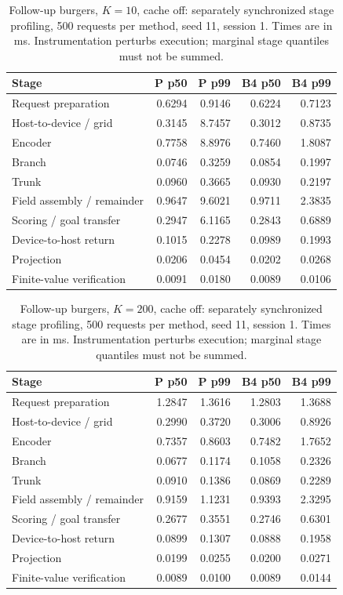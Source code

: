 \begin{table}[ht]
\centering\small
\caption{Follow-up burgers, $K=10$, cache off: separately synchronized stage profiling, 500 requests per method, seed 11, session 1. Times are in ms. Instrumentation perturbs execution; marginal stage quantiles must not be summed.}\label{tab:e2_profile_burgers_10_off}
\begin{tabular}{@{}lrrrr@{}}\toprule
Stage & P p50 & P p99 & B4 p50 & B4 p99\\\midrule
Request preparation & 0.6294 & 0.9146 & 0.6224 & 0.7123\\
Host-to-device / grid & 0.3145 & 8.7457 & 0.3012 & 0.8735\\
Encoder & 0.7758 & 8.8976 & 0.7460 & 1.8087\\
Branch & 0.0746 & 0.3259 & 0.0854 & 0.1997\\
Trunk & 0.0960 & 0.3665 & 0.0930 & 0.2197\\
Field assembly / remainder & 0.9647 & 9.6021 & 0.9711 & 2.3835\\
Scoring / goal transfer & 0.2947 & 6.1165 & 0.2843 & 0.6889\\
Device-to-host return & 0.1015 & 0.2278 & 0.0989 & 0.1993\\
Projection & 0.0206 & 0.0454 & 0.0202 & 0.0268\\
Finite-value verification & 0.0091 & 0.0180 & 0.0089 & 0.0106\\
\bottomrule\end{tabular}
\end{table}

\begin{table}[ht]
\centering\small
\caption{Follow-up burgers, $K=200$, cache off: separately synchronized stage profiling, 500 requests per method, seed 11, session 1. Times are in ms. Instrumentation perturbs execution; marginal stage quantiles must not be summed.}\label{tab:e2_profile_burgers_200_off}
\begin{tabular}{@{}lrrrr@{}}\toprule
Stage & P p50 & P p99 & B4 p50 & B4 p99\\\midrule
Request preparation & 1.2847 & 1.3616 & 1.2803 & 1.3688\\
Host-to-device / grid & 0.2990 & 0.3720 & 0.3006 & 0.8926\\
Encoder & 0.7357 & 0.8603 & 0.7482 & 1.7652\\
Branch & 0.0677 & 0.1174 & 0.1058 & 0.2326\\
Trunk & 0.0910 & 0.1386 & 0.0869 & 0.2289\\
Field assembly / remainder & 0.9159 & 1.1231 & 0.9393 & 2.3295\\
Scoring / goal transfer & 0.2677 & 0.3551 & 0.2746 & 0.6301\\
Device-to-host return & 0.0899 & 0.1307 & 0.0888 & 0.1958\\
Projection & 0.0199 & 0.0255 & 0.0200 & 0.0271\\
Finite-value verification & 0.0089 & 0.0100 & 0.0089 & 0.0144\\
\bottomrule\end{tabular}
\end{table}

